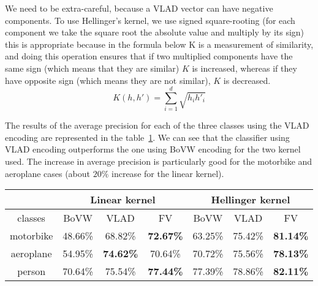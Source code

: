 \documentclass{article}
\begin{document}
We need to be extra-careful, because a VLAD vector can have negative
components. To use Hellinger's kernel, we use signed square-rooting
(for each component we take the square root the absolute value and
multiply by its sign) this is appropriate because in the
formula below K is a measurement of similarity, and doing this
operation ensures that if two multiplied components have the same sign
(which means that they are similar) $K$ is increased, whereas if they
have opposite sign (which means they are not similar), $K$ is
decreased.
\begin{equation*}
  K(h, h') = \sum_{i = 1}^d \sqrt{h_i h'_i}
\end{equation*}

The results of the average precision for each of the three classes
using the VLAD encoding are represented in the
table~\ref{tab:encodings}. We can see that the classifier using VLAD
encoding outperforms the one using BoVW encoding for the two kernel
used. The increase in average precision is particularly good for the
motorbike and aeroplane cases (about $20\%$ increase for the linear
kernel).

\begin{table}[h!]
  \centering
  \begin{tabular}{| c | c | c | c || c | c | c |}
    \hline
    & \multicolumn{3}{c||}{Linear kernel} & \multicolumn{3}{c|}{Hellinger kernel} \\
    \hline
    classes & BoVW & VLAD & FV & BoVW & VLAD & FV \\
    \hline
    motorbike  & 48.66\% & 68.82\% & \textbf{72.67\%} & 63.25\% & 75.42\% & \textbf{81.14\%} \\
    aeroplane  & 54.95\% & \textbf{74.62\%} & 70.64\% & 70.72\% & 75.56\% & \textbf{78.13\%} \\
    person     & 70.64\% & 75.54\% & \textbf{77.44\%} & 77.39\% & 78.86\% & \textbf{82.11\%} \\
    \hline
  \end{tabular}
   \label{tab:encodings}
\end{table}


\end{document}
